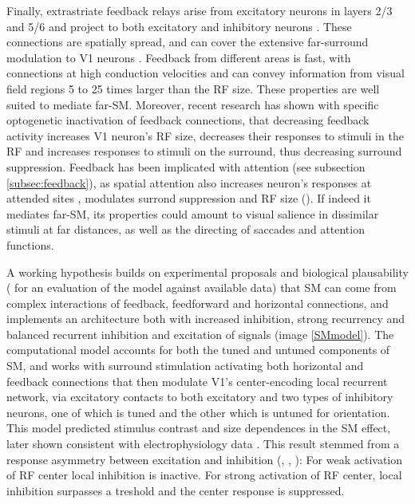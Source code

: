 Finally, extrastriate feedback relays arise from excitatory neurons in layers 2/3 and 5/6 and project to both excitatory and inhibitory neurons \cite{Anderson2009}. These connections are spatially spread, and can cover the extensive far-surround modulation to V1 neurons \cite{Angelucci2002}. Feedback from different areas is fast, with connections at high conduction velocities \cite{Girard2001} and can convey information from visual field regions 5 to 25 times larger than the RF size. These properties are well suited to mediate far-SM. Moreover, recent research \cite{Nurminen2018} has shown with specific optogenetic inactivation of feedback connections, that decreasing feedback activity increases V1 neuron's RF size, decreases their responses to stimuli in the RF and increases responses to stimuli on the surround, thus decreasing surround suppression. Feedback has been implicated with attention (see subsection \ref{subsec:feedback}), as spatial attention also increases neuron's responses at attended sites \cite{McAdams2005}, modulates surrond suppression \cite{Sundberg2009} and RF size (\cite{Roberts2007}). If indeed it mediates far-SM, its properties could amount to visual salience in dissimilar stimuli at far distances, as well as the directing of saccades and attention functions. 

A working hypothesis \cite{Schwabe2006} builds on experimental proposals and biological plausability (\cite{Angelucci2017} for an evaluation of the model against available data) that SM can come from complex interactions of feedback, feedforward and horizontal connections, and implements an architecture both with increased inhibition, strong recurrency and balanced recurrent inhibition and excitation of signals (image \ref{SMmodel}). The computational model accounts for both the tuned and untuned components of SM, and works with surround stimulation activating both horizontal and feedback connections that then modulate V1's center-encoding local recurrent network, via excitatory contacts to both excitatory and two types of inhibitory neurons, one of which is tuned and the other which is untuned for orientation. This model predicted stimulus contrast and size dependences in the SM effect, later shown consistent with electrophysiology data \cite{Schwabe2010}. This result stemmed from a response asymmetry between excitation and inhibition (\cite{Somers1998}, \cite{Dragoi2000}, \cite{Schwabe2006}): For weak activation of RF center local inhibition is inactive. For strong activation of RF center, local inhibition surpasses a treshold and the center response is suppressed. 


